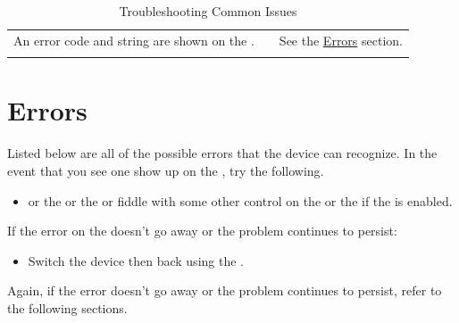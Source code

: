 \begin{longtabu} { X[5,l,m] | X[2,c,m] | X[7,l,m] }
  An error code and string are shown on the .
    & 
    & See the \hyperref[Error Codes]{Errors} section. \\

  \bhrule
\caption{Troubleshooting Common Issues}
\end{longtabu}

\chapter{Errors} \label{Error Codes}

Listed below are all of the possible errors that the device can recognize.  In
the event that you see one show up on the , try the following.

\begin{itemize}
  \item {} or  the  or  the  or fiddle with
    some other control on the  or  the  if the  is
    enabled.
\end{itemize}

If the error on the  doesn't go away or the problem continues to persist:

\begin{itemize}
  \item Switch the device  then back  using the .
\end{itemize}

Again, if the error doesn't go away or the problem continues to persist, refer
to the following sections.


